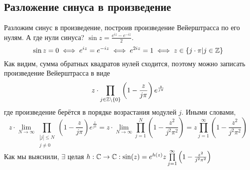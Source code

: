 \documentclass[a4paper]{report}
\begin{document}
    \subsection{Разложение синуса в произведение}
    Разложим синус в произведение, построив произведение Вейерштрасса по его нулям.
    А где нули синуса?
    $\sin z = \frac{e^{iz} - e^{-iz}}{2}$.
    \[\sin z = 0 \iff e^{iz} = e^{-iz} \iff e^{2iz} = 1 \iff z \in \left\{j \cdot \pi\middle|j \in \mathbb{Z}\right\}\]
    Как видим, сумма обратных квадратов нулей сходится, поэтому можно записать произведение Вейерштрасса в виде
    \[z\cdot\prod\limits_{j \in \mathbb{Z} \setminus \{0\}}\left(1 - \frac{z}{j \pi}\right)e^{\frac{z}{j\pi}}\]
    где произведение берётся в порядке возрастания модулей $j$.
    Иными словами, \[z \cdot \lim\limits_{N \to \infty}\prod\limits_{\substack{|j| \le N \\ j \ne 0}}\left(1 - \frac{z}{j \pi}\right)e^{\frac{z}{j\pi}} = z \cdot \lim\limits_{N \to \infty}\prod\limits_{j = 1}^{N}\left(1 - \frac{z^2}{j^2 \pi^2}\right) = z \prod\limits_{j = 1}^{\infty}\left(1 - \frac{z^2}{j^2 \pi^2}\right)\]
    Как мы выяснили, $\exists$ целая $h: \mathbb{C} \rightarrow \mathbb{C}: \sin(z) = e^{h(z)} z \prod\limits_{j = 1}^{\infty}\left(1 - \frac{z^2}{j^2 \pi^2}\right)$
\end{document}
